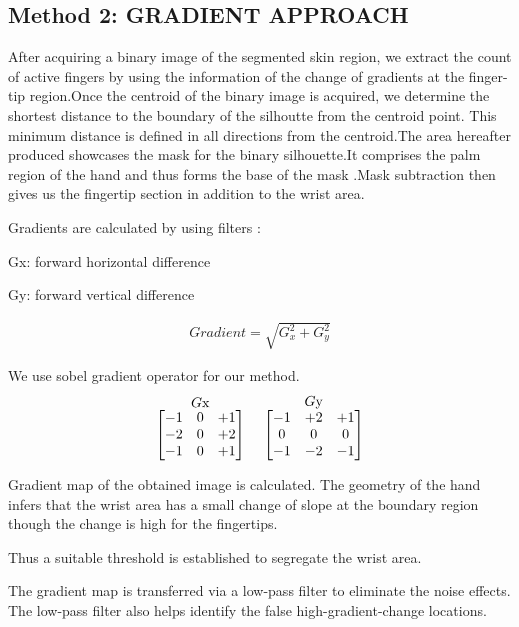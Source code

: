 \documentclass[conference]{IEEEtran}
\begin{document}
\subsection{Method 2: GRADIENT APPROACH}
After acquiring a binary image of the segmented skin region, we extract the count of active fingers by using the information of the change of gradients at the finger-tip region.Once the centroid of the binary image is acquired, we determine the shortest distance to the boundary of the silhoutte from the centroid point. This minimum distance is defined in all directions from the centroid.The area hereafter produced showcases the mask for the binary silhouette.It comprises the palm region of the hand and thus forms the base of the mask  \cite{6481804}.Mask subtraction then gives us the fingertip section in addition to the wrist area.

Gradients are calculated by using filters :

Gx: forward horizontal difference 

Gy: forward vertical difference

\begin{equation}
\begin{aligned}
Gradient = \sqrt{G_x^2 + G_y^2}
\end{aligned}
\end{equation}


We use sobel gradient operator for our method.
\[
  \stackrel{\mbox{$G$x}}{%
    \begin{bmatrix}
    -1 & 0 & +1 \\
    -2 & 0 & +2 \\
    -1 & 0 & +1
    \end{bmatrix}%
  }\ \quad
  \stackrel{\mbox{$G$y}}{%
    \begin{bmatrix}
    -1 & +2 & +1 \\
    0 & 0 & 0 \\
    -1 & -2 & -1
    \end{bmatrix}%
  }
\]


Gradient map of the obtained image is calculated. The geometry of the hand infers that the wrist area has a small change of slope at the boundary region though the change is high for the fingertips.

Thus a suitable threshold is established to segregate the wrist area.

The gradient map is transferred via a low-pass filter to eliminate the noise effects. The low-pass filter also helps identify the false high-gradient-change locations.
\end{document}
